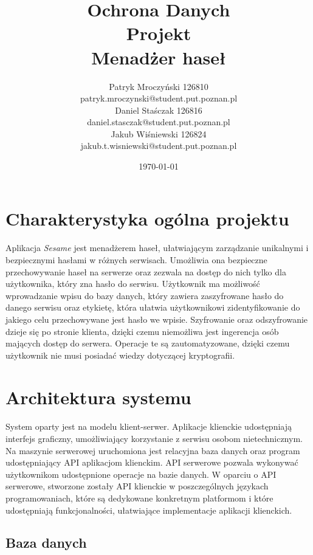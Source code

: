 \documentclass{article}
\title{
    Ochrona Danych
    \\
    [0.2em]\smaller{}
    Projekt
    \\
    Menadżer haseł \insertprojectname}
\author{
    Patryk Mroczyński 126810
    \\
    patryk.mroczynski@student.put.poznan.pl
    \\
    Daniel Staśczak 126816
    \\
    daniel.stasczak@student.put.poznan.pl
    \\
    Jakub Wiśniewski 126824
    \\
    jakub.t.wisniewski@student.put.poznan.pl
}
\date{\today}
\newcommand{\insertprojectname}{\textit{Sesame }}
\begin{document}
    \maketitle

    \newpage
    \tableofcontents
    \listoffigures
    \listoftables

    \newpage

    \section{Charakterystyka ogólna projektu}
    \paragraph{}Aplikacja \insertprojectname jest menadżerem haseł, ułatwiającym zarządzanie unikalnymi i bezpiecznymi hasłami w różnych serwisach. Umożliwia ona bezpieczne przechowywanie haseł na serwerze oraz zezwala na dostęp do nich tylko dla użytkownika, który zna hasło do serwisu. Użytkownik ma możliwość wprowadzanie wpisu do bazy danych, który zawiera zaszyfrowane hasło do danego serwisu oraz etykietę, która ułatwia użytkownikowi zidentyfikowanie do jakiego celu przechowywane jest hasło we wpisie. Szyfrowanie oraz odszyfrowanie dzieje się po stronie klienta, dzięki czemu niemożliwa jest ingerencja osób mających dostęp do serwera. Operacje te są zautomatyzowane, dzięki czemu użytkownik nie musi posiadać wiedzy dotyczącej kryptografii.

    \section{Architektura systemu}
    \paragraph{}System oparty jest na modelu klient-serwer. Aplikacje klienckie udostępniają interfejs graficzny, umożliwiający korzystanie z serwisu osobom nietechnicznym. Na maszynie serwerowej uruchomiona jest relacyjna baza danych oraz program udostępniający API aplikacjom klienckim. API serwerowe pozwala wykonywać użytkownikom udostępnione operacje na bazie danych. W oparciu o API serwerowe, stworzone zostały API klienckie w poszczególnych językach programowaniach, które są dedykowane konkretnym platformom i które udostępniają funkcjonalności, ułatwiające implementacje aplikacji klienckich.

    \subsection{Baza danych}
\end{document}
